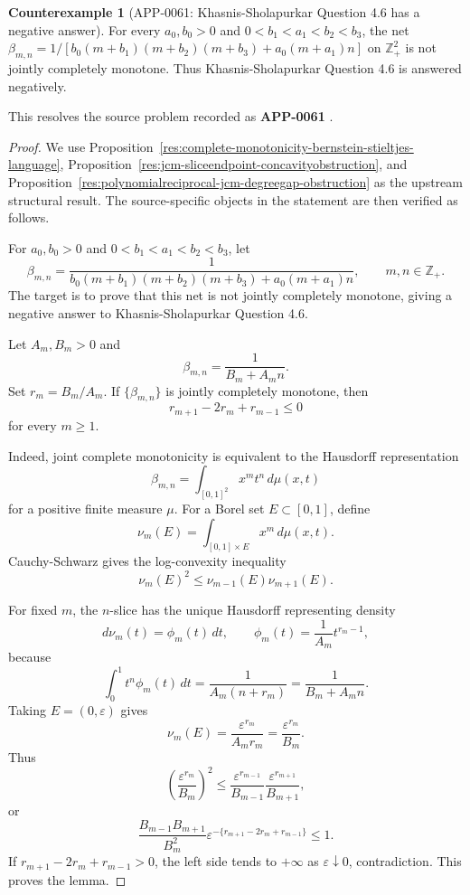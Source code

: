 \documentclass[11pt]{article}
\numberwithin{equation}{section}
\theoremstyle{definition}
\newtheorem{counterexample}[theorem]{Counterexample}
\theoremstyle{remark}
\newcommand{\1}{\mathbf 1}
\begin{document}
\begin{counterexample}[APP-0061: Khasnis-Sholapurkar Question 4.6 has a negative answer]
\label{res:khasnis-sholapurkar-q46-negativeanswer}
For every \(a_0,b_0>0\) and \(0<b_1<a_1<b_2<b_3\), the net \(\beta_{m,n}=1/[b_0(m+b_1)(m+b_2)(m+b_3)+a_0(m+a_1)n]\) on \(\mathbb Z_+^2\) is not jointly completely monotone. Thus Khasnis-Sholapurkar Question 4.6 is answered negatively.



This resolves the source problem recorded as \textbf{APP-0061} \cite{app-app-0061-source}.
\end{counterexample}

\begin{proof}
We use Proposition~\ref{res:complete-monotonicity-bernstein-stieltjes-language}, Proposition~\ref{res:jcm-sliceendpoint-concavityobstruction}, and Proposition~\ref{res:polynomialreciprocal-jcm-degreegap-obstruction} as the upstream structural result. The source-specific objects in the statement are then verified as follows.

For \(a_0,b_0>0\) and \(0<b_1<a_1<b_2<b_3\), let
\[
\beta_{m,n}
=
\frac{1}{b_0(m+b_1)(m+b_2)(m+b_3)+a_0(m+a_1)n},
\qquad m,n\in\mathbb Z_+.
\]
The target is to prove that this net is not jointly completely monotone, giving a negative answer to Khasnis-Sholapurkar Question 4.6.

Let \(A_m,B_m>0\) and
\[
\beta_{m,n}=\frac{1}{B_m+A_m n}.
\]
Set \(r_m=B_m/A_m\). If \(\{\beta_{m,n}\}\) is jointly completely monotone, then
\[
r_{m+1}-2r_m+r_{m-1}\le 0
\]
for every \(m\ge1\).

Indeed, joint complete monotonicity is equivalent to the Hausdorff representation
\[
\beta_{m,n}=\int_{[0,1]^2} x^m t^n\,d\mu(x,t)
\]
for a positive finite measure \(\mu\). For a Borel set \(E\subset[0,1]\), define
\[
\nu_m(E)=\int_{[0,1]\times E}x^m\,d\mu(x,t).
\]
Cauchy-Schwarz gives the log-convexity inequality
\[
\nu_m(E)^2\le \nu_{m-1}(E)\nu_{m+1}(E).
\]

For fixed \(m\), the \(n\)-slice has the unique Hausdorff representing density
\[
d\nu_m(t)=\phi_m(t)\,dt,\qquad
\phi_m(t)=\frac{1}{A_m}t^{r_m-1},
\]
because
\[
\int_0^1 t^n\phi_m(t)\,dt
=
\frac{1}{A_m(n+r_m)}
=
\frac{1}{B_m+A_mn}.
\]
Taking \(E=(0,\varepsilon)\) gives
\[
\nu_m(E)=\frac{\varepsilon^{r_m}}{A_m r_m}
=
\frac{\varepsilon^{r_m}}{B_m}.
\]
Thus
\[
\left(\frac{\varepsilon^{r_m}}{B_m}\right)^2
\le
\frac{\varepsilon^{r_{m-1}}}{B_{m-1}}
\frac{\varepsilon^{r_{m+1}}}{B_{m+1}},
\]
or
\[
\frac{B_{m-1}B_{m+1}}{B_m^2}
\varepsilon^{-\{r_{m+1}-2r_m+r_{m-1}\}}\le1.
\]
If \(r_{m+1}-2r_m+r_{m-1}>0\), the left side tends to \(+\infty\) as \(\varepsilon\downarrow0\), contradiction. This proves the lemma.
\end{proof}
\end{document}
